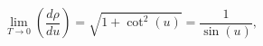 \begin{equation}
 \lim_{T\to 0}   \left(\frac{d \rho}{du}\right) =
  \sqrt{1+\cot^2(u)}  = \frac{1}{\sin(u)},
\end{equation}

